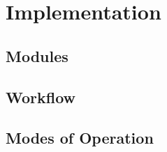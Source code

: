 

\chapter{Implementation}
\label{chap:implementation}

\section{Modules}

\section{Workflow}

\section{Modes of Operation}